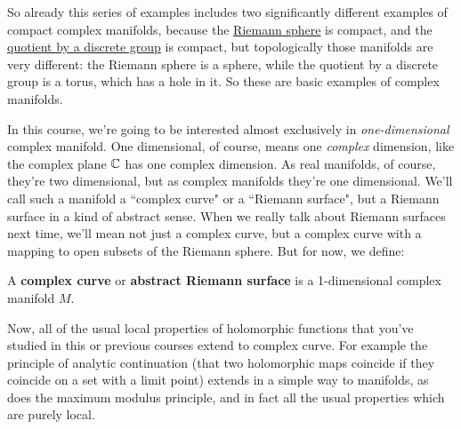 \documentclass{article}
\begin{document}
So already this series of examples includes two significantly different examples of compact complex manifolds, because the \hyperref[example:riemann_complex_manifold]{Riemann sphere} is compact, and the \hyperref[example:torus_complex_manifold]{quotient by a discrete group} is compact, but topologically those manifolds are very different: the Riemann sphere is a sphere, while the quotient by a discrete group is a torus, which has a hole in it. So these are basic examples of complex manifolds.

In this course, we're going to be interested almost exclusively in \textit{one-dimensional} complex manifold. One dimensional, of course, means one \textit{complex} dimension, like the complex plane \(\mathbb{C}\) has one complex dimension. As real manifolds, of course, they're two dimensional, but as complex manifolds they're one dimensional. We'll call such a manifold a ``complex curve" or a ``Riemann surface", but a Riemann surface in a kind of abstract sense. When we really talk about Riemann surfaces next time, we'll mean not just a complex curve, but a complex curve with a mapping to open subsets of the Riemann sphere. But for now, we define:

\begin{definition}
A \textbf{complex curve} or \textbf{abstract Riemann surface} is a 1-dimensional complex manifold \(M\).
\end{definition}

Now, all of the usual local properties of holomorphic functions that you've studied in this or previous courses extend to complex curve. For example the principle of analytic continuation (that two holomorphic maps coincide if they coincide on a set with a limit point) extends in a simple way to manifolds, as does the maximum modulus principle, and in fact all the usual properties which are purely local.
\end{document}
